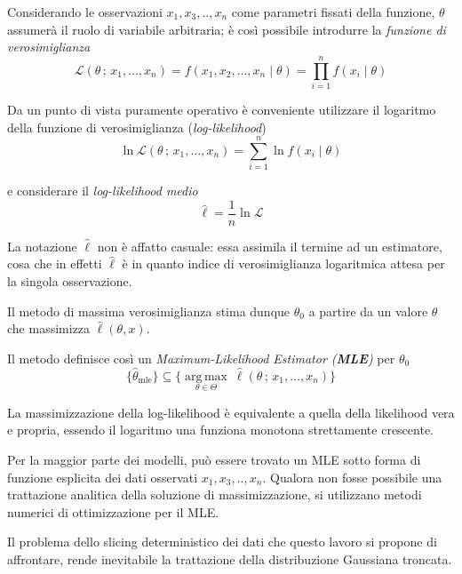 \documentclass[12pt,openright,twoside,a4paper]{book}
\begin{document}
Considerando le osservazioni $x_1,x_3,..,x_n$ come parametri fissati della funzione, $\theta$ assumerà il ruolo di variabile arbitraria; è così possibile introdurre la \textit{funzione di verosimiglianza}
\begin{equation}
\mathcal{L}(\theta\,;\,x_1,\ldots,x_n) = f(x_1,x_2,\ldots,x_n\mid\theta) = \prod_{i=1}^n f(x_i\mid\theta)
\end{equation}

Da un punto di vista puramente operativo è conveniente utilizzare il logaritmo della funzione di verosimiglianza (\textit{log-likelihood})
 \begin{equation}
 \ln\mathcal{L}(\theta\,;\,x_1,\ldots,x_n) = \sum_{i=1}^n \ln f(x_i\mid\theta)
 \end{equation}

e considerare il \textit{log-likelihood medio}
\begin{equation}
\hat\ell = \frac1n \ln\mathcal{L}
\end{equation}

La notazione $\hat\ell$ non è affatto casuale: essa assimila il termine ad un estimatore, cosa che in effetti $\hat\ell$ è in quanto indice di verosimiglianza logaritmica attesa per la singola osservazione.

Il metodo di massima verosimiglianza stima dunque $\theta_0$ a partire da un valore $\theta$ che massimizza $\hat\ell(\theta,x)$.

Il metodo definisce così un \textit{Maximum-Likelihood Estimator (\textbf{MLE}) } per $\theta_0$
\begin{equation}
\{ \hat\theta_\mathrm{mle}\} \subseteq \{ \underset{\theta\in\Theta}{\operatorname{arg\,max}}\ \hat\ell(\theta\,;\,x_1,\ldots,x_n) \}
\end{equation}

La massimizzazione della log-likelihood è equivalente a quella della likelihood vera e propria, essendo il logaritmo una funziona monotona strettamente crescente. \cite{MLE}

Per la maggior parte dei modelli, può essere trovato un MLE sotto forma di funzione esplicita dei dati osservati $x_1,x_3,..,x_n$.
Qualora non fosse possibile una trattazione analitica della soluzione di massimizzazione, si utilizzano metodi numerici di ottimizzazione per il MLE.

Il problema dello slicing deterministico dei dati che questo lavoro si propone di affrontare, rende inevitabile la trattazione della distribuzione Gaussiana troncata.
\end{document}
